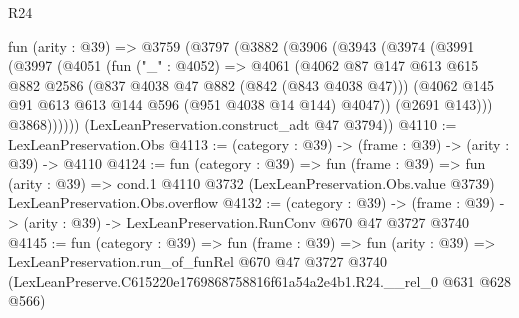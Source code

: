 \begin{lexlean}{R24}
\begin{coremodule}
  fun (arity : @39) =>
  @3759
    (@3797
      (@3882
        (@3906
          (@3943
            (@3974
              (@3991
                (@3997
                  (@4051
                    (fun ("_" : @4052) =>
                    @4061
                      (@4062
                        @87
                        @147
                        @613
                        @615
                        @882
                        @2586
                        (@837 @4038 @47 @882 (@842 (@843 @4038 @47)))
                        (@4062 @145 @91 @613 @613 @144 @596 (@951 @4038 @14 @144) @4047))
                      (@2691 @143)))
                  @3868))))))
      (LexLeanPreservation.construct_adt @47 @3794))
@4110 := LexLeanPreservation.Obs
@4113 := (category : @39) -> (frame : @39) -> (arity : @39) -> @4110
@4124 := fun (category : @39) =>
  fun (frame : @39) =>
  fun (arity : @39) =>
  cond.{1} @4110 @3732 (LexLeanPreservation.Obs.value @3739) LexLeanPreservation.Obs.overflow
@4132 := (category : @39) ->
  (frame : @39) -> (arity : @39) -> LexLeanPreservation.RunConv @670 @47 @3727 @3740
@4145 := fun (category : @39) =>
  fun (frame : @39) =>
  fun (arity : @39) =>
  LexLeanPreservation.run_of_funRel
    @670
    @47
    @3727
    @3740
    (LexLeanPreserve.C615220e1769868758816f61a54a2e4b1.R24.__rel_0 @631 @628 @566)
\end{coremodule}
\end{lexlean}
